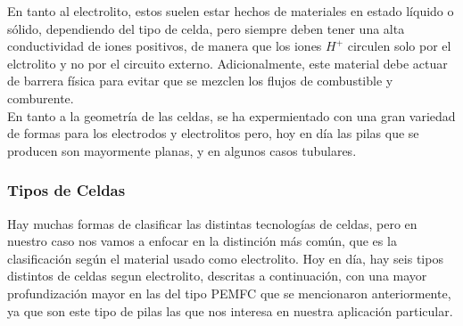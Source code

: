 En tanto al electrolito, estos suelen estar hechos de materiales en estado líquido o sólido, dependiendo del tipo de celda, pero siempre deben tener una alta conductividad de iones positivos, de manera que los iones $H^{+}$ circulen solo por el elctrolito y no por el circuito externo. Adicionalmente, este material debe actuar de barrera física para evitar que se mezclen los flujos de combustible y comburente.\\

En tanto a la geometría de las celdas, se ha expermientado con una gran variedad de formas para los electrodos y electrolitos pero, hoy en día las pilas que se producen son mayormente planas, y en algunos casos tubulares.\\

\subsubsection{Tipos de Celdas}\label{tipos_celdas}

Hay muchas formas de clasificar las distintas tecnologías de celdas, pero en nuestro caso nos vamos a enfocar en la distinción más común, que es la clasificación según el material usado como electrolito. Hoy en día, hay seis tipos distintos de celdas segun electrolito, descritas a continuación, con una mayor profundización mayor en las del tipo PEMFC que se mencionaron anteriormente, ya que son este tipo de pilas las que nos interesa en nuestra aplicación particular.\\

